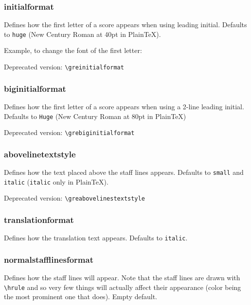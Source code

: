\subsubsection*{initialformat}
Defines how the first letter of a score appears when using leading
initial.  Defaults to \verb=huge= (New Century Roman at 40pt in
Plain\TeX).

Example, to change the font of the first letter:

\begin{latexcode}
  \renewenvironment*{initialformat}{\fontfamily{ppl}\selectfont\huge}{}
\end{latexcode}

\smallskip\hskip 15pt Deprecated version: \verb=\greinitialformat=

\subsubsection*{biginitialformat}
Defines how the first letter of a score appears when using a 2-line
leading initial.  Defaults to \verb=Huge= (New Century Roman at 80pt
in Plain\TeX)

\smallskip\hskip 15pt Deprecated version: \verb=\grebiginitialformat=

\subsubsection*{abovelinetextstyle}
Defines how the text placed above the staff lines appears.  Defaults
to \verb=small= and \verb=italic= (\verb=italic= only in Plain\TeX).

\smallskip\hskip 15pt Deprecated version: \verb=\greabovelinestextstyle=

\subsubsection*{translationformat}
Defines how the translation text appears.  Defaults to \verb=italic=.

\subsubsection*{normalstafflinesformat}
Defines how the staff lines will appear.  Note that the staff lines
are drawn with \verb=\hrule= and so very few things will actually
affect their appearance (color being the most prominent one that
does).  Empty default.

